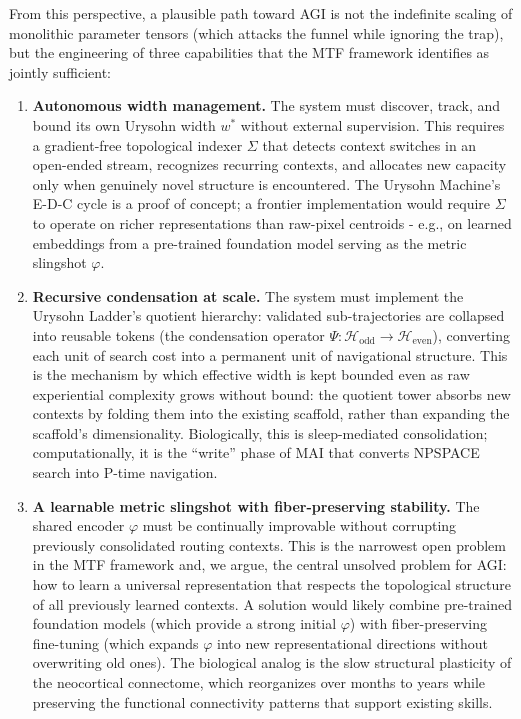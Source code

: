 \documentclass{article}
\begin{document}
From this perspective, a plausible path toward AGI is not the indefinite scaling of monolithic parameter tensors (which attacks the funnel while ignoring the trap), but the engineering of three capabilities that the MTF framework identifies as jointly sufficient:
\begin{enumerate}
    \item \textbf{Autonomous width management.}
    The system must discover, track, and bound its own Urysohn width $w^*$ without external supervision.
    This requires a gradient-free topological indexer $\Sigma$ that detects context switches in an open-ended stream, recognizes recurring contexts, and allocates new capacity only when genuinely novel structure is encountered.
    The Urysohn Machine's E-D-C cycle is a proof of concept; a frontier implementation would require $\Sigma$ to operate on richer representations than raw-pixel centroids - e.g., on learned embeddings from a pre-trained foundation model serving as the metric slingshot $\varphi$.
    
    \item \textbf{Recursive condensation at scale.}
    The system must implement the Urysohn Ladder's quotient hierarchy: validated sub-trajectories are collapsed into reusable tokens (the condensation operator $\Psi: \mathcal{H}_{\mathrm{odd}} \to \mathcal{H}_{\mathrm{even}}$), converting each unit of search cost into a permanent unit of navigational structure.
    This is the mechanism by which effective width is kept bounded even as raw experiential complexity grows without bound: the quotient tower absorbs new contexts by folding them into the existing scaffold, rather than expanding the scaffold's dimensionality.
    Biologically, this is sleep-mediated consolidation; computationally, it is the ``write'' phase of MAI that converts NPSPACE search into P-time navigation.
    
    \item \textbf{A learnable metric slingshot with fiber-preserving stability.}
    The shared encoder $\varphi$ must be continually improvable without corrupting previously consolidated routing contexts.
    This is the narrowest open problem in the MTF framework and, we argue, the central unsolved problem for AGI: how to learn a universal representation that respects the topological structure of all previously learned contexts.
    A solution would likely combine pre-trained foundation models (which provide a strong initial $\varphi$) with fiber-preserving fine-tuning (which expands $\varphi$ into new representational directions without overwriting old ones).
    The biological analog is the slow structural plasticity of the neocortical connectome, which reorganizes over months to years while preserving the functional connectivity patterns that support existing skills.
\end{enumerate}
\end{document}

